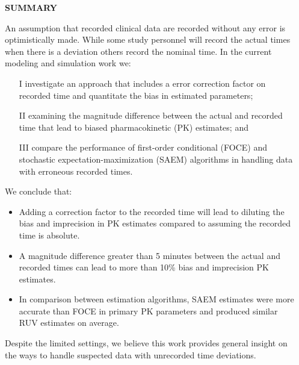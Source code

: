 \documentclass[final]{beamer}
\newlength{\sepwidth}
\newlength{\colwidth}
\newcommand{\separatorcolumn}{\begin{column}{\sepwidth}\end{column}}
\begin{document}
\begin{frame}[t]
\begin{columns}[t]
\separatorcolumn

\begin{column}{\colwidth}

  \begin{alertblock}{\textbf{SUMMARY}}

An assumption that recorded clinical data are recorded without any error is optimistically made. While some study personnel will record the actual times when there is a deviation others record the nominal time. In the current modeling and simulation work we:
\begin{itemize}
\item[I] investigate an approach that includes a error correction factor on recorded time and quantitate the bias in estimated parameters;
\item[II] examining the magnitude difference between the actual and recorded time that lead to biased pharmacokinetic (PK) estimates; and 
\item[III] compare the performance of first-order conditional (FOCE) and stochastic expectation-maximization (SAEM) algorithms in handling data with erroneous recorded times. 
\end{itemize} 
We conclude that:
\begin{itemize}
    \item Adding a correction factor to the recorded time will lead to diluting the bias and imprecision in PK estimates compared to assuming the recorded time is absolute.
    \item A magnitude difference greater than 5 minutes between the actual and recorded times can lead to more than 10\% bias and imprecision PK estimates.
    \item In comparison between estimation algorithms, SAEM estimates were more accurate than FOCE in primary PK parameters and produced similar RUV estimates on average. 
\end{itemize}

Despite the limited settings, we believe this work provides general insight on the ways to handle suspected data with unrecorded time deviations.


\end{alertblock}
\end{column}
\end{columns}
\end{frame}
\end{document}
